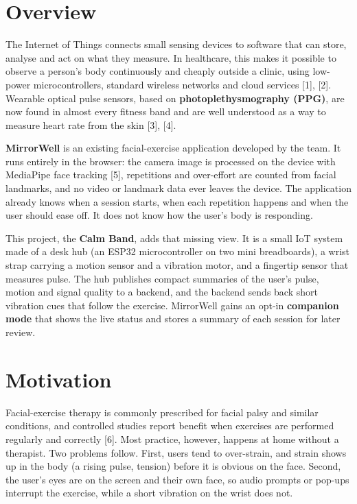 \documentclass[12pt,letterpaper,oneside]{report}
\begin{document}
\section{Overview}\label{sec:1.1}

The Internet of Things connects small sensing devices to software that can store, analyse and act on what they measure. In healthcare, this makes it possible to observe a person's body continuously and cheaply outside a clinic, using low-power microcontrollers, standard wireless networks and cloud services [1], [2]. Wearable optical pulse sensors, based on \textbf{photoplethysmography (PPG)}, are now found in almost every fitness band and are well understood as a way to measure heart rate from the skin [3], [4].


\textbf{MirrorWell} is an existing facial-exercise application developed by the team. It runs entirely in the browser: the camera image is processed on the device with MediaPipe face tracking [5], repetitions and over-effort are counted from facial landmarks, and no video or landmark data ever leaves the device. The application already knows when a session starts, when each repetition happens and when the user should ease off. It does not know how the user's body is responding.


This project, the \textbf{Calm Band}, adds that missing view. It is a small IoT system made of a desk hub (an ESP32 microcontroller on two mini breadboards), a wrist strap carrying a motion sensor and a vibration motor, and a fingertip sensor that measures pulse. The hub publishes compact summaries of the user's pulse, motion and signal quality to a backend, and the backend sends back short vibration cues that follow the exercise. MirrorWell gains an opt-in \textbf{companion mode} that shows the live status and stores a summary of each session for later review.


\section{Motivation}\label{sec:1.2}

Facial-exercise therapy is commonly prescribed for facial palsy and similar conditions, and controlled studies report benefit when exercises are performed regularly and correctly [6]. Most practice, however, happens at home without a therapist. Two problems follow. First, users tend to over-strain, and strain shows up in the body (a rising pulse, tension) before it is obvious on the face. Second, the user's eyes are on the screen and their own face, so audio prompts or pop-ups interrupt the exercise, while a short vibration on the wrist does not.
\end{document}
